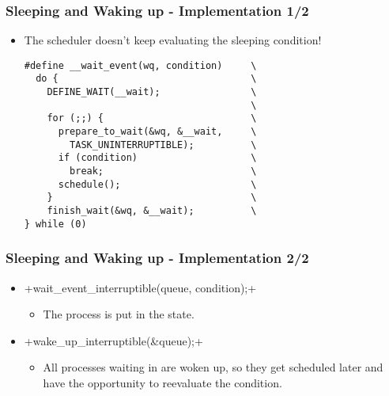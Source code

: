 \begin{frame}[fragile]
  \frametitle{Sleeping and Waking up - Implementation 1/2}
  \begin{itemize}
  \item The scheduler doesn't keep evaluating the sleeping condition!
\begin{verbatim}
#define __wait_event(wq, condition)     \
  do {                                  \
    DEFINE_WAIT(__wait);                \
                                        \
    for (;;) {                          \
      prepare_to_wait(&wq, &__wait,     \
        TASK_UNINTERRUPTIBLE);          \
      if (condition)                    \
        break;                          \
      schedule();                       \
    }                                   \
    finish_wait(&wq, &__wait);          \
} while (0)
\end{verbatim}
\end{itemize}
\end{frame}

\begin{frame}[fragile]
  \frametitle{Sleeping and Waking up - Implementation 2/2}
  \begin{itemize}
  \item \mint{c}+wait_event_interruptible(queue, condition);+
    \begin{itemize}
    \item The process is put in the  state.
    \end{itemize}
  \item {}+wake_up_interruptible(&queue);+
    \begin{itemize}
    \item All processes waiting in  are woken up, so they get
      scheduled later and have the opportunity to reevaluate the
      condition.
    \end{itemize}
  \end{itemize}
\end{frame}

